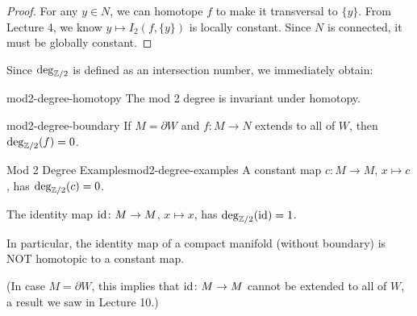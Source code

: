 \begin{proof}
    For any $y \in N$, we can homotope $f$ to make it transversal to $\{y\}$. From Lecture 4, we know $y \mapsto I_2(f, \{y\})$ is locally constant. Since $N$ is connected, it must be globally constant.
\end{proof}

Since $\deg_{\mathbb{Z}/2}$ is defined as an intersection number, we immediately obtain:

\begin{theorem}{}{mod2-degree-homotopy}
    The mod 2 degree is invariant under homotopy.
\end{theorem}

\begin{theorem}{}{mod2-degree-boundary}
    If $M = \partial W$ and $f \colon M \to N$ extends to all of $W$, then $\deg_{\mathbb{Z}/2}(f) = 0$.
\end{theorem}

\begin{example}{Mod 2 Degree Examples}{mod2-degree-examples}
    A constant map $c \colon M \to M$, $x \mapsto c$, has $\deg_{\mathbb{Z}/2}(c) = 0$.

    The identity map $\mathrm{id} \colon M \to M$, $x \mapsto x$, has $\deg_{\mathbb{Z}/2}(\mathrm{id}) = 1$.

    In particular, the identity map of a compact manifold (without boundary) is NOT homotopic to a constant map.

    (In case $M = \partial W$, this implies that $\mathrm{id} \colon M \to M$ cannot be extended to all of $W$, a result we saw in Lecture 10.)
\end{example}
